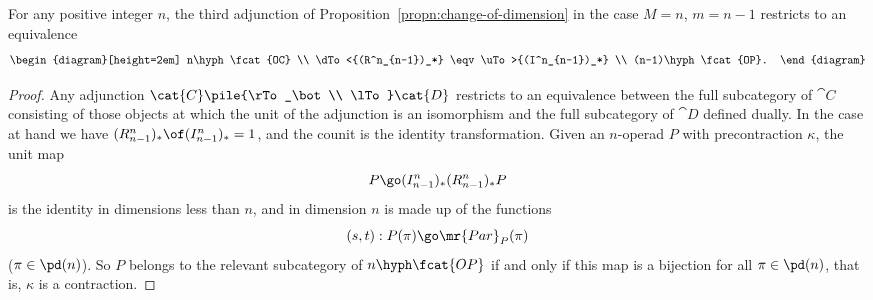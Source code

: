 \begin{propn}	
For any positive integer $n$, the third adjunction of
Proposition~\ref{propn:change-of-dimension} in the case $M=n$,
$m=n-1$ restricts to an equivalence
\[
\begin{diagram}[height=2em]
n\hyph\fcat{OC}	\\
\dTo<{(R^n_{n-1})_*} \eqv	\uTo>{(I^n_{n-1})_*}	\\
(n-1)\hyph\fcat{OP}.
\end{diagram}
\]
\end{propn}
%
\begin{proof}
Any adjunction $\cat{C} \pile{\rTo_\bot \\ \lTo} \cat{D}$ restricts to an
equivalence between the full subcategory of $\cat{C}$ consisting of those
objects at which the unit of the adjunction is an isomorphism and the full
subcategory of $\cat{D}$ defined dually.  In the case at hand we have
$(R^n_{n-1})_* \of (I^n_{n-1})_* = 1$, and the counit is the identity
transformation.  Given an $n$-operad $P$ with precontraction $\kappa$, the
unit map
\[
P \go (I^n_{n-1})_* (R^n_{n-1})_* P
\]
is the identity in dimensions less than $n$, and in dimension $n$ is made
up of the functions
\[
(s,t): P(\pi) \go \mr{Par}_P(\pi)
\]
($\pi\in\pd(n)$).  So $P$ belongs to the relevant subcategory of
$n\hyph\fcat{OP}$ if and only if this map is a bijection for all
$\pi\in\pd(n)$, that is, $\kappa$ is a contraction.
\done
\end{proof}

